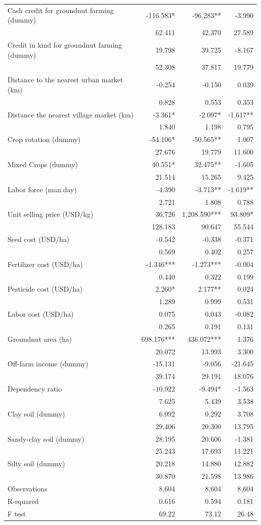 \documentclass[
]{article}
\begin{document}
\begin{longtable}[t]{lrrr}
Cash credit for groundnut farming (dummy) & -116.583* & -96.283** & -3.990\\
 & 62.411 & 42.370 & 27.589\\
Credit in kind for groundnut farming (dummy) & 19.798 & 39.725 & -8.167\\
 & 52.308 & 37.817 & 19.779\\
Distance to the nearest urban market (km) & -0.254 & -0.150 & 0.039\\
 & 0.828 & 0.553 & 0.353\\
Distance the nearest village market (km) & -3.361* & -2.097* & -1.617**\\
 & 1.840 & 1.198 & 0.795\\
Crop rotation (dummy) & -54.106* & -50.565** & 1.007\\
 & 27.676 & 19.779 & 11.600\\
Mixed Crops (dummy) & 40.551* & 32.475** & -1.605\\
 & 21.514 & 15.265 & 9.425\\
Labor force (man.day) & -4.390 & -3.713** & -1.619**\\
 & 2.721 & 1.808 & 0.788\\
Unit selling price (USD/kg) & 36.726 & 1,208.590*** & 93.809*\\
 & 128.183 & 90.647 & 55.544\\
Seed cost (USD/ha) & -0.542 & -0.338 & -0.371\\
 & 0.569 & 0.402 & 0.257\\
Fertilizer cost (USD/ha) & -1.346*** & -1.273*** & -0.004\\
 & 0.440 & 0.322 & 0.199\\
Pesticide cost (USD/ha) & 2.260* & 2.177** & 0.024\\
 & 1.289 & 0.999 & 0.531\\
Labor cost (USD/ha) & 0.075 & 0.043 & -0.082\\
 & 0.265 & 0.191 & 0.131\\
Groundnut area (ha) & 698.176*** & 436.072*** & 1.376\\
 & 20.072 & 13.993 & 3.300\\
Off-farm income (dummy) & -15.131 & -9.056 & -21.645\\
 & 39.174 & 29.191 & 18.076\\
Dependency ratio & -10.922 & -9.494* & -1.563\\
 & 7.625 & 5.439 & 3.538\\
Clay soil (dummy) & 6.092 & 0.292 & 3.708\\
 & 29.406 & 20.300 & 13.795\\
Sandy-clay soil (dummy) & 28.195 & 20.606 & -1.381\\
 & 25.243 & 17.693 & 11.221\\
Silty soil (dummy) & 20.218 & 14.880 & 12.882\\
 & 30.870 & 21.598 & 13.986\\
Observations & 8,604 & 8,604 & 8,604\\
R-squared & 0.616 & 0.594 & 0.181\\
F test & 69.22 & 73.12 & 26.48\\*
\end{longtable}
\endgroup{}
\end{document}
